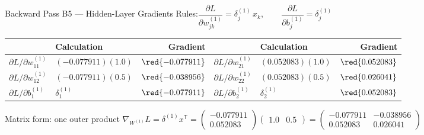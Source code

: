 \documentclass[aspectratio=169,10pt]{beamer}
\begin{document}
\begin{frame}{Backward Pass B5 --- Hidden-Layer Gradients}
Rules:\quad $\dfrac{\partial L}{\partial w^{(1)}_{jk}}=\delta^{(1)}_j\,x_k,\qquad \dfrac{\partial L}{\partial b^{(1)}_j}=\delta^{(1)}_j$
\vspace{3pt}

\centering\small\renewcommand{\arraystretch}{1.35}
\begin{tabular}{l l r @{\qquad} l l r}
\toprule
& \textbf{Calculation} & \textbf{Gradient} & & \textbf{Calculation} & \textbf{Gradient}\\
\midrule
$\partial L/\partial w^{(1)}_{11}$ & $(-0.077911)(1.0)$ & $\red{-0.077911}$ & $\partial L/\partial w^{(1)}_{21}$ & $(0.052083)(1.0)$ & $\red{0.052083}$\\
$\partial L/\partial w^{(1)}_{12}$ & $(-0.077911)(0.5)$ & $\red{-0.038956}$ & $\partial L/\partial w^{(1)}_{22}$ & $(0.052083)(0.5)$ & $\red{0.026041}$\\
$\partial L/\partial b^{(1)}_{1}$ & $\delta^{(1)}_1$ & $\red{-0.077911}$ & $\partial L/\partial b^{(1)}_{2}$ & $\delta^{(1)}_2$ & $\red{0.052083}$\\
\bottomrule
\end{tabular}
\vspace{4pt}

\begin{fbx}{Matrix form: one outer product}
$\nabla_{W^{(1)}}L=\delta^{(1)}x^{\mathsf T}=\begin{pmatrix}-0.077911\\0.052083\end{pmatrix}\begin{pmatrix}1.0&0.5\end{pmatrix}=\begin{pmatrix}-0.077911&-0.038956\\0.052083&0.026041\end{pmatrix}$
\end{fbx}
\end{frame}
\end{document}
